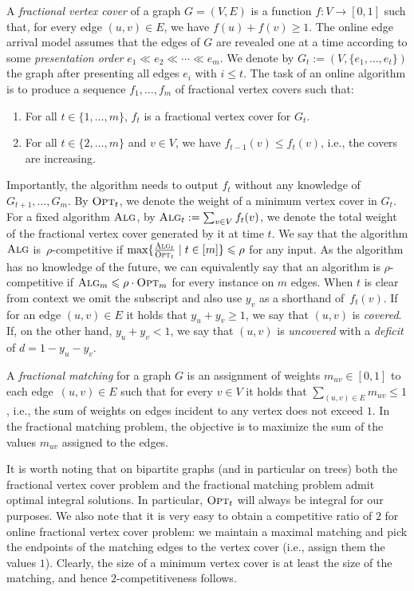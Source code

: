 \documentclass[a4paper,USenglish,cleveref,autoref,thm-restate,pdfa]{lipics-v2021}
\let\leq\leqslant
\let\geq\geqslant
\newcommand{\alg}{\textsc{Alg}\xspace}
\newcommand{\opt}{\textsc{Opt}\xspace}
\newcommand{\compratio}{\rho}
\begin{document}
A \emph{fractional vertex cover}
of a graph $G=(V,E)$ is a function $f: V \to [0, 1]$ such
that, for every edge $(u,v)\in E$, we have $f(u) + f(v) \geq 1$.
The online edge arrival model assumes that
the edges of $G$ are revealed one at a time according to some \emph{presentation order} $e_1 \ll e_2 \ll \cdots \ll e_m$.
We denote by $G_t:=(V,\{e_1, \dots, e_t\})$ the graph after presenting all edges $e_i$ with $i \leq t$.
The task of an online algorithm is to produce a sequence $f_1, \ldots, f_m$ of fractional vertex covers such that:

\begin{enumerate}[(1)]
  \item For all $t \in \{1, \ldots, m\}$, $f_t$ is a fractional vertex cover for $G_t$.
  \item For all $t \in \{2, \ldots, m\}$ and $v\in V$, we have $f_{t-1}(v) \leq f_{t}(v)$, i.e., the covers are increasing.
\end{enumerate}

Importantly, the algorithm needs to output $f_t$ without any knowledge of $G_{t+1}, \dots, G_m$.
By $\opt_t$, we denote the weight of a minimum vertex cover in $G_t$.
For a fixed algorithm $\alg$, by $\alg_t := \sum_{v\in V} f_t(v)$, we denote the total weight of the fractional vertex cover generated by it at time $t$.
We say that the algorithm $\alg$ is~$\compratio$-competitive if $\max\{\frac{\alg_t}{\opt_t} \mid t \in [m]\} \leq \compratio$ for any input.
As the algorithm has no knowledge of the future, we can equivalently say that an algorithm is $\compratio$-competitive if $\alg_m\leq \compratio \cdot  \opt_m$ for every instance on $m$ edges.
When $t$ is clear from context we omit the subscript and also use $y_v$ as a shorthand of~$f_t(v)$.
If for an edge $(u, v)\in E$ it holds that $y_u + y_v \geq 1$, we say that $(u,v)$ is \emph{covered}.
If, on the other hand, $y_u + y_v < 1$, we say that $(u,v)$ is \emph{uncovered} with a \emph{deficit} of $d = 1 - y_u - y_v$.

A \emph{fractional matching} for a graph $G$ is an assignment of weights $m_{uv} \in [0, 1]$ to each edge~$(u, v) \in E$ such that for every $v \in V$ it holds that $\sum_{(u,v) \in E} m_{uv} \leq 1$, i.e., the sum of weights on edges incident to
any vertex does not exceed $1$. In the fractional matching problem, the objective is to maximize the sum of the values $m_{uv}$ assigned to the edges.

It is worth noting that on bipartite graphs (and in particular on trees) both the fractional vertex cover problem and the fractional matching problem admit optimal integral solutions.
In particular, $\opt_t$ will always be integral for our purposes.
We also note that it is very easy to obtain a competitive ratio of $2$ for online fractional vertex cover problem: we maintain a maximal matching and pick the endpoints of the matching edges to the vertex cover (i.e., assign them the values $1$).
Clearly, the size of a minimum vertex cover is at least the size of the matching, and hence $2$-competitiveness follows.
\end{document}
